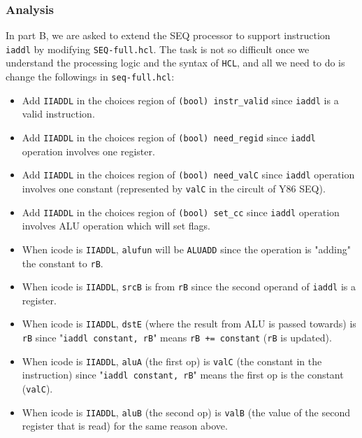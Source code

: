 \documentclass[12pt,a4paper]{article}
\begin{document}
\subsubsection{Analysis}
In part B, we are asked to extend the SEQ processor to support instruction \texttt{iaddl} by modifying \texttt{SEQ-full.hcl}.
The task is not so difficult once we understand the processing logic and the syntax of \texttt{HCL}, and all we need to do is change the followings in \texttt{seq-full.hcl}:
\begin{itemize}
        \item Add \texttt{IIADDL} in the choices region of \texttt{(bool) instr\_valid} since \texttt{iaddl} is a valid instruction.
        \item Add \texttt{IIADDL} in the choices region of \texttt{(bool) need\_regid} since \texttt{iaddl} operation involves one register.
        \item Add \texttt{IIADDL} in the choices region of \texttt{(bool) need\_valC} since \texttt{iaddl} operation involves one constant (represented by \texttt{valC} in the circult of Y86 SEQ).
        \item Add \texttt{IIADDL} in the choices region of \texttt{(bool) set\_cc} since \texttt{iaddl} operation involves ALU operation which will set flags.
        \item When icode is \texttt{IIADDL}, \texttt{alufun} will be \texttt{ALUADD} since the operation is "adding" the constant to \texttt{rB}.
        \item When icode is \texttt{IIADDL}, \texttt{srcB} is from \texttt{rB} since the second operand of \texttt{iaddl} is a register.
        \item When icode is \texttt{IIADDL}, \texttt{dstE} (where the result from ALU is passed towards) is \texttt{rB} since "\texttt{iaddl constant, rB}" means \texttt{rB += constant} (\texttt{rB} is updated). 
        \item When icode is \texttt{IIADDL}, \texttt{aluA} (the first op) is \texttt{valC} (the constant in the instruction) since "\texttt{iaddl constant, rB}" means the first op is the constant (\texttt{valC}).
        \item When icode is \texttt{IIADDL}, \texttt{aluB} (the second op) is \texttt{valB} (the value of the second register that is read) for the same reason above.
\end{itemize}
\end{document}
